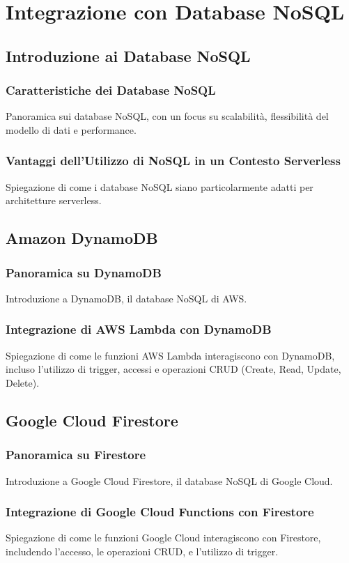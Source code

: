 \documentclass[12pt,a4paper,twoside]{book}
\begin{document}
\chapter{Integrazione con Database NoSQL}

\section{Introduzione ai Database NoSQL}
\subsection{Caratteristiche dei Database NoSQL}
Panoramica sui database NoSQL, con un focus su scalabilità, flessibilità del modello di dati e performance.

\subsection{Vantaggi dell'Utilizzo di NoSQL in un Contesto Serverless}
Spiegazione di come i database NoSQL siano particolarmente adatti per architetture serverless.

\section{Amazon DynamoDB}
\subsection{Panoramica su DynamoDB}
Introduzione a DynamoDB, il database NoSQL di AWS.

\subsection{Integrazione di AWS Lambda con DynamoDB}
Spiegazione di come le funzioni AWS Lambda interagiscono con DynamoDB, incluso l'utilizzo di trigger, accessi e operazioni CRUD (Create, Read, Update, Delete).

\section{Google Cloud Firestore}
\subsection{Panoramica su Firestore}
Introduzione a Google Cloud Firestore, il database NoSQL di Google Cloud.

\subsection{Integrazione di Google Cloud Functions con Firestore}
Spiegazione di come le funzioni Google Cloud interagiscono con Firestore, includendo l'accesso, le operazioni CRUD, e l'utilizzo di trigger.
\end{document}
